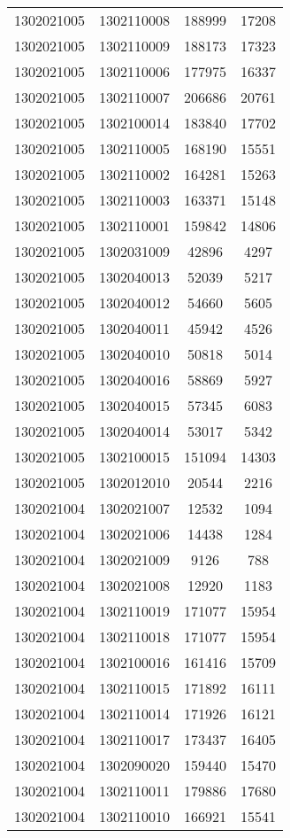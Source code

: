 \begin{longtable}{llcc}
1302021005 & 1302110008 & 188999 & 17208\\
1302021005 & 1302110009 & 188173 & 17323\\
1302021005 & 1302110006 & 177975 & 16337\\
1302021005 & 1302110007 & 206686 & 20761\\
1302021005 & 1302100014 & 183840 & 17702\\
1302021005 & 1302110005 & 168190 & 15551\\
1302021005 & 1302110002 & 164281 & 15263\\
1302021005 & 1302110003 & 163371 & 15148\\
1302021005 & 1302110001 & 159842 & 14806\\
1302021005 & 1302031009 & 42896 & 4297\\
1302021005 & 1302040013 & 52039 & 5217\\
1302021005 & 1302040012 & 54660 & 5605\\
1302021005 & 1302040011 & 45942 & 4526\\
1302021005 & 1302040010 & 50818 & 5014\\
1302021005 & 1302040016 & 58869 & 5927\\
1302021005 & 1302040015 & 57345 & 6083\\
1302021005 & 1302040014 & 53017 & 5342\\
1302021005 & 1302100015 & 151094 & 14303\\
1302021005 & 1302012010 & 20544 & 2216\\
1302021004 & 1302021007 & 12532 & 1094\\
1302021004 & 1302021006 & 14438 & 1284\\
1302021004 & 1302021009 & 9126 & 788\\
1302021004 & 1302021008 & 12920 & 1183\\
1302021004 & 1302110019 & 171077 & 15954\\
1302021004 & 1302110018 & 171077 & 15954\\
1302021004 & 1302100016 & 161416 & 15709\\
1302021004 & 1302110015 & 171892 & 16111\\
1302021004 & 1302110014 & 171926 & 16121\\
1302021004 & 1302110017 & 173437 & 16405\\
1302021004 & 1302090020 & 159440 & 15470\\
1302021004 & 1302110011 & 179886 & 17680\\
1302021004 & 1302110010 & 166921 & 15541\\

\end{longtable}
